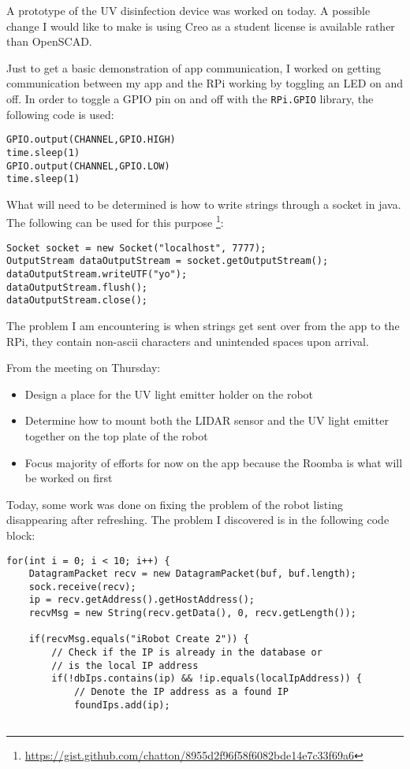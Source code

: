 \documentclass[fontsize=11pt, %
                             paper=a4, %
                             twoside, %
                             captions=tableheading,
                             index=totoc,
                             hyperref]{labbook}
\begin{document}
\begin{addmargin}[0cm]{0cm}
A prototype of the UV disinfection device was worked on today. A possible change I would like to make is using Creo as a student license is available rather than OpenSCAD.

Just to get a basic demonstration of app communication, I worked on getting communication between my app and the RPi working by toggling an LED on and off. In order to toggle a GPIO pin on and off with the \texttt{RPi.GPIO} library, the following code is used:
\begin{Verbatim}
GPIO.output(CHANNEL,GPIO.HIGH)
time.sleep(1)
GPIO.output(CHANNEL,GPIO.LOW)
time.sleep(1)
\end{Verbatim}
What will need to be determined is how to write strings through a socket in java. The following can be used for this purpose \footnote{\url{https://gist.github.com/chatton/8955d2f96f58f6082bde14e7c33f69a6}}:
\begin{Verbatim}
Socket socket = new Socket("localhost", 7777);
OutputStream dataOutputStream = socket.getOutputStream();
dataOutputStream.writeUTF("yo");
dataOutputStream.flush();
dataOutputStream.close();
\end{Verbatim}
The problem I am encountering is when strings get sent over from the app to the RPi, they contain non-ascii characters and unintended spaces upon arrival.

From the meeting on Thursday:
\begin{itemize}
\item Design a place for the UV light emitter holder on the robot
\item Determine how to mount both the LIDAR sensor and the UV light
emitter together on the top plate of the robot
\item Focus majority of efforts for now on the app because the Roomba is what
will be worked on first
\end{itemize}
Today, some work was done on fixing the problem of the robot listing disappearing after refreshing. The problem I discovered is in the following code block:
\begin{Verbatim}[tabsize=4]
for(int i = 0; i < 10; i++) {
	DatagramPacket recv = new DatagramPacket(buf, buf.length);
	sock.receive(recv);
	ip = recv.getAddress().getHostAddress();
	recvMsg = new String(recv.getData(), 0, recv.getLength());

	if(recvMsg.equals("iRobot Create 2")) {
		// Check if the IP is already in the database or
		// is the local IP address
		if(!dbIps.contains(ip) && !ip.equals(localIpAddress)) {
			// Denote the IP address as a found IP
			foundIps.add(ip);


\end{Verbatim}
\end{addmargin}
\end{document}
